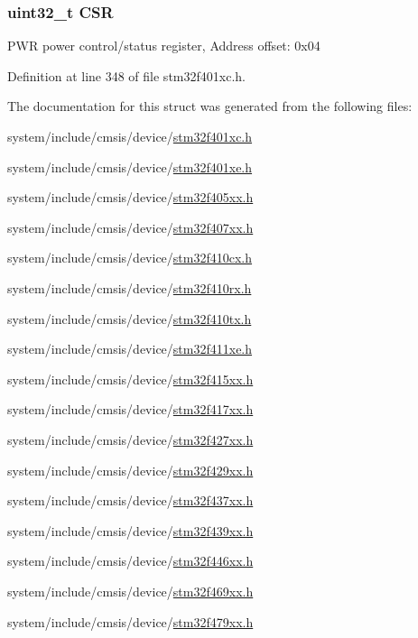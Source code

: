 \subsubsection[{\texorpdfstring{C\+SR}{CSR}}]{ uint32\+\_\+t C\+SR}\hypertarget{struct_p_w_r___type_def_a876dd0a8546697065f406b7543e27af2}{}\label{struct_p_w_r___type_def_a876dd0a8546697065f406b7543e27af2}
P\+WR power control/status register, Address offset\+: 0x04 

Definition at line 348 of file stm32f401xc.\+h.



The documentation for this struct was generated from the following files\+:\begin{DoxyCompactItemize}
\item 
system/include/cmsis/device/\hyperlink{stm32f401xc_8h}{stm32f401xc.\+h}\item 
system/include/cmsis/device/\hyperlink{stm32f401xe_8h}{stm32f401xe.\+h}\item 
system/include/cmsis/device/\hyperlink{stm32f405xx_8h}{stm32f405xx.\+h}\item 
system/include/cmsis/device/\hyperlink{stm32f407xx_8h}{stm32f407xx.\+h}\item 
system/include/cmsis/device/\hyperlink{stm32f410cx_8h}{stm32f410cx.\+h}\item 
system/include/cmsis/device/\hyperlink{stm32f410rx_8h}{stm32f410rx.\+h}\item 
system/include/cmsis/device/\hyperlink{stm32f410tx_8h}{stm32f410tx.\+h}\item 
system/include/cmsis/device/\hyperlink{stm32f411xe_8h}{stm32f411xe.\+h}\item 
system/include/cmsis/device/\hyperlink{stm32f415xx_8h}{stm32f415xx.\+h}\item 
system/include/cmsis/device/\hyperlink{stm32f417xx_8h}{stm32f417xx.\+h}\item 
system/include/cmsis/device/\hyperlink{stm32f427xx_8h}{stm32f427xx.\+h}\item 
system/include/cmsis/device/\hyperlink{stm32f429xx_8h}{stm32f429xx.\+h}\item 
system/include/cmsis/device/\hyperlink{stm32f437xx_8h}{stm32f437xx.\+h}\item 
system/include/cmsis/device/\hyperlink{stm32f439xx_8h}{stm32f439xx.\+h}\item 
system/include/cmsis/device/\hyperlink{stm32f446xx_8h}{stm32f446xx.\+h}\item 
system/include/cmsis/device/\hyperlink{stm32f469xx_8h}{stm32f469xx.\+h}\item 
system/include/cmsis/device/\hyperlink{stm32f479xx_8h}{stm32f479xx.\+h}\end{DoxyCompactItemize}

